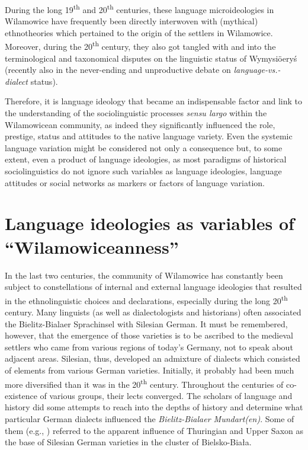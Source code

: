 \documentclass[output=paper]{langscibook}
\begin{document}
During the long 19\textsuperscript{th} and 20\textsuperscript{th} centuries, these language microideologies in Wilamowice have frequently been directly interwoven with (mythical) ethnotheories which pertained to the origin of the settlers in Wilamowice. Moreover, during the 20\textsuperscript{th} century, they also got tangled with and into the terminological and taxonomical disputes on the linguistic status of Wymysiöeryś (recently also in the never-ending and unproductive debate on \textit{language-vs.-dialect} status). 

Therefore, it is language ideology that became an indispensable factor and link to the understanding of the sociolinguistic processes \textit{sensu largo} within the Wilamowicean community, as indeed they significantly influenced the role, prestige, status and attitudes to the native language variety. Even the systemic language variation might be considered not only a consequence but, to some extent, even a product of language ideologies, as most paradigms of historical sociolinguistics do not ignore such variables as language ideologies, language attitudes or social networks as markers or factors of language variation.

\section{Language ideologies as variables of “Wilamowiceanness”}
In the last two centuries, the community of Wilamowice has constantly been subject to constellations of internal and external language ideologies that resulted in the ethnolinguistic choices and declarations, especially during the long 20\textsuperscript{th} century. Many linguists (as well as dialectologists and historians) often associated the Bielitz-Bialaer Sprachinsel with Silesian German. It must be remembered, however, that the emergence of those varieties is to be ascribed to the medieval settlers who came from various regions of today's Germany, not to speak about adjacent areas. Silesian, thus, developed an admixture of dialects which consisted of elements from various German varieties. Initially, it probably had been much more diversified than it was in the 20\textsuperscript{th} century. Throughout the centuries of co-existence of various groups, their lects converged. The scholars of language and history did some attempts to reach into the depths of history and determine what particular German dialects influenced the \textit{Bielitz-Bialaer Mundart(en)}. Some of them (e.g., \citealt[192]{wagner_beeler_1935}) referred to the apparent influence of Thuringian and Upper Saxon as the base of Silesian German varieties in the cluster of Bielsko-Biała.
\end{document}

